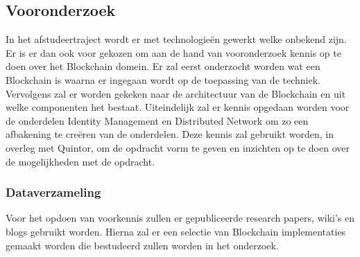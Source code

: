 \subsection{Vooronderzoek}

In het afstudeertraject wordt er met technologieën gewerkt welke onbekend zijn. Er is er dan ook voor gekozen om aan de hand van vooronderzoek kennis op te doen over het Blockchain domein. Er zal eerst onderzocht worden wat een Blockchain is waarna er ingegaan wordt op de toepassing van de techniek. Vervolgens zal er worden gekeken naar de architectuur van de Blockchain en uit welke componenten het bestaat. Uiteindelijk zal er kennis opgedaan worden voor de onderdelen Identity Management en Distributed Network om zo een afbakening te creëren van de onderdelen. Deze kennis zal gebruikt worden, in overleg met Quintor, om de opdracht vorm te geven en inzichten op te doen over de mogelijkheden met de opdracht.

\subsubsection{Dataverzameling}
Voor het opdoen van voorkennis zullen er gepubliceerde research papers, wiki’s en blogs gebruikt worden. Hierna zal er een selectie van Blockchain implementaties gemaakt worden die bestudeerd zullen worden in het onderzoek.